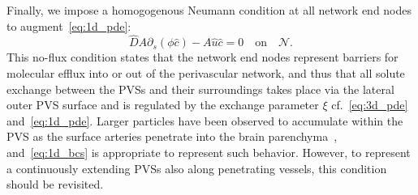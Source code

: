 Finally, we impose a homogogenous Neumann condition at all network end
nodes to augment~\eqref{eq:1d_pde}:
\begin{equation}
    \hat D A \partial_s (\phi \hat c) - A \hat u \hat c  = 0 \quad \mathrm{on} \quad \mathcal{N}.
    \label{eq:1d_bcs}
\end{equation}
This no-flux condition states that the network end nodes represent
barriers for molecular efflux into or out of the perivascular network,
and thus that all solute exchange between the PVSs and their
surroundings takes place via the lateral outer PVS surface and is
regulated by the exchange parameter $\xi$ cf.~\eqref{eq:3d_pde}
and~\eqref{eq:1d_pde}. Larger particles have been observed to
accumulate within the PVS as the surface arteries penetrate into the
brain parenchyma~\cite{mestre2018flow, bedussi2018paravascular},
and~\eqref{eq:1d_bcs} is appropriate to represent such
behavior. However, to represent a continuously extending PVSs also
along penetrating vessels, this condition should be revisited.


